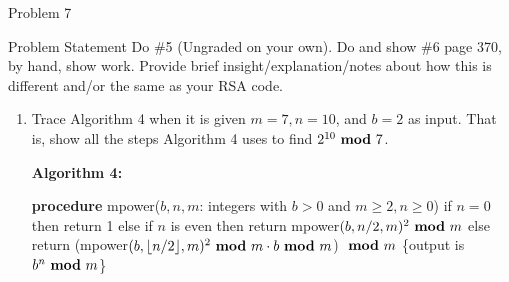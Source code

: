 \begin{problem}{Problem 7}
    \begin{statement}{Problem Statement}
        Do \#5 (Ungraded on your own). Do and show \#6 page 370, by hand, show work. Provide brief insight/explanation/notes about how this is different and/or the same as your RSA code.
    \end{statement}

    \begin{Highlight}[Solution - \#6]
        \begin{enumerate}[label = \arabic*., start = 6]
            \item Trace Algorithm 4 when it is given $m = 7, n = 10$, and $b = 2$ as input. That is, show all the steps Algorithm 4 uses to find $2^{10} \text{ \textbf{mod} } 7$. \vspace*{1em}
            
            \noindent \textbf{Algorithm 4:} \vspace*{1em}

            \textbf{procedure} mpower($b, n, m$: integers with $b > 0$ and $m \geq 2, n \geq 0$) \newline
            if $n = 0$ then \newline
            \hspace*{10pt} return 1 \newline
            else if $n$ is even then \newline
            \hspace*{10pt} return mpower$(b,n/2,m)^{2} \text{ \textbf{mod} } m$ \newline
            else \newline
            \hspace*{10pt} return (mpower$(b,\lfloor n/2 \rfloor,m)^{2} \text{ \textbf{mod} } m \cdot b \text{ \textbf{mod} } m$) $\text{ \textbf{mod} } m$ \newline
            \{output is $b^{n} \text{ \textbf{mod} } m$\} \newline


\end{enumerate}
\end{Highlight}
\end{problem}
